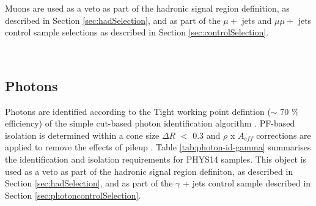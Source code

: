 Muons are used as a veto as part of the hadronic signal region definition, as described in Section \ref{sec:hadSelection}, and as part of the $\mu +$ jets and $\mu\mu +$ jets control sample selections as described in Section \ref{sec:controlSelection}.

\begin{figure}[h]
  \centering
  ~~
  ~~  
\end{figure}


\subsection{Photons}
\label{sec:photon-id}
Photons are identified according to the Tight working point defintion ($\sim$ 70 $\%$ efficiency) of the simple cut-based photon identification algorithm \cite{photon-id}. PF-based isolation is determined within a cone size $\Delta R$ $<$ 0.3 and $\rho$ x $A_{eff}$ corrections are applied to remove the effects of pileup \cite{pf-photon}. Table \ref{tab:photon-id-gamma} summarises the identification and isolation requirements for PHYS14 samples. 
This object is used as a veto as part of the hadronic signal region definiton, as described in Section \ref{sec:hadSelection}, and as part of the $\gamma$ + jets control sample described in Section \ref{sec:photoncontrolSelection}.

